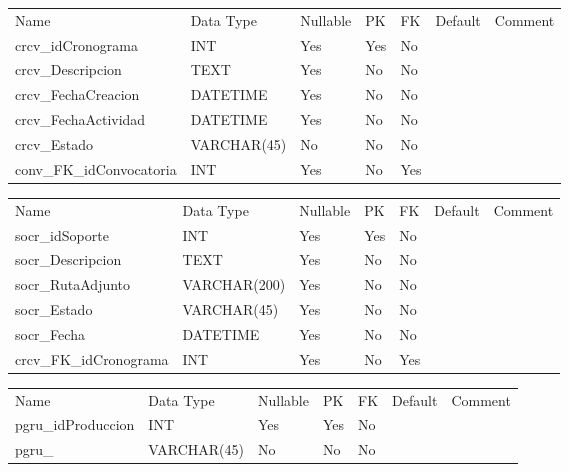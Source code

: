 			\begin{center}
				\begin{tabular}{ |l|l|l|l|l|l|l| }
					\hline
					Name & Data Type & Nullable & PK & FK & Default & Comment \\
					crcv_idCronograma & INT & Yes & Yes & No &  & \\ \hline 
crcv_Descripcion & TEXT & Yes & No & No &  & \\ \hline 
crcv_FechaCreacion & DATETIME & Yes & No & No &  & \\ \hline 
crcv_FechaActividad & DATETIME & Yes & No & No &  & \\ \hline 
crcv_Estado & VARCHAR(45) & No & No & No &  & \\ \hline 
conv_FK_idConvocatoria & INT & Yes & No & Yes &  & \\ \hline 

				\end{tabular}
			\end{center}
		

			\begin{center}
				\begin{tabular}{ |l|l|l|l|l|l|l| }
					\hline
					Name & Data Type & Nullable & PK & FK & Default & Comment \\
					socr_idSoporte & INT & Yes & Yes & No &  & \\ \hline 
socr_Descripcion & TEXT & Yes & No & No &  & \\ \hline 
socr_RutaAdjunto & VARCHAR(200) & Yes & No & No &  & \\ \hline 
socr_Estado & VARCHAR(45) & Yes & No & No &  & \\ \hline 
socr_Fecha & DATETIME & Yes & No & No &  & \\ \hline 
crcv_FK_idCronograma & INT & Yes & No & Yes &  & \\ \hline 

				\end{tabular}
			\end{center}
		

			\begin{center}
				\begin{tabular}{ |l|l|l|l|l|l|l| }
					\hline
					Name & Data Type & Nullable & PK & FK & Default & Comment \\
					pgru_idProduccion & INT & Yes & Yes & No &  & \\ \hline 
pgru_ & VARCHAR(45) & No & No & No &  & \\ \hline 

				\end{tabular}
			\end{center}
		

